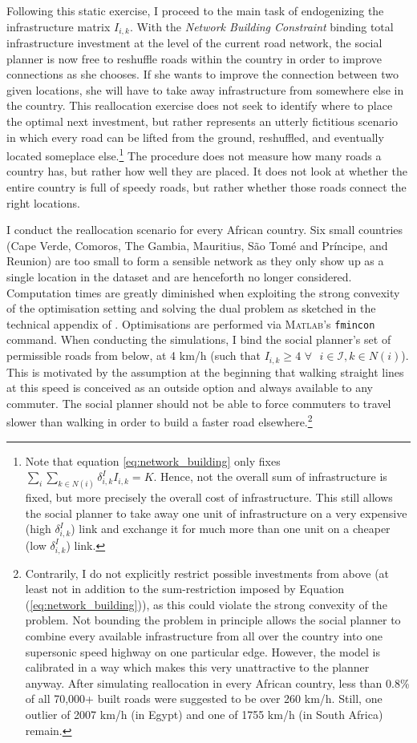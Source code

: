 \documentclass[11pt, oneside]{article}   	%
\let\oldref\ref
\renewcommand{\ref}[1]{(\oldref{#1})}
\begin{document}
Following this static exercise, I proceed to the main task of endogenizing the infrastructure matrix $I_{i,k}$. With the \emph{Network Building Constraint} binding total infrastructure investment at the level of the current road network, the social planner is now free to reshuffle roads within the country in order to improve connections as she chooses. If she wants to improve the connection between two given locations, she will have to take away infrastructure from somewhere else in the country. This reallocation exercise does not seek to identify where to place the optimal next investment, but rather represents an utterly fictitious scenario in which every road can be lifted from the ground, reshuffled, and eventually located someplace else.\footnote{Note that equation \eqref{eq:network_building} only fixes $\sum_{i}^{}\sum_{k \in N(i)}^{} \delta_{i,k}^{I}I_{i,k} = K$. Hence, not the overall sum of infrastructure is fixed, but more precisely the overall cost of infrastructure. This still allows the social planner to take away one unit of infrastructure on a very expensive (high $\delta_{i,k}^{I}$) link and exchange it for much more than one unit on a cheaper (low $\delta_{i,k}^{I}$) link.} The procedure does not measure how many roads a country has, but rather how well they are placed. It does not look at whether the entire country is full of speedy roads, but rather whether those roads connect the right locations.

I conduct the reallocation scenario for every African country. Six small countries (Cape Verde, Comoros, The Gambia, Mauritius, São Tomé and Príncipe, and Reunion) are too small to form a sensible network as they only show up as a single location in the dataset and are henceforth no longer considered. Computation times are greatly diminished when exploiting the strong convexity of the optimisation setting and solving the dual problem as sketched in the technical appendix of \cite{Fajgelbaum_OptimalTransportNetworks_2017}. Optimisations are performed via \textsc{Matlab}'s \texttt{fmincon} command. When conducting the simulations, I bind the social planner's set of permissible roads from below, at 4 km/h (such that $I_{i,k} \geq 4$ $ \forall \textrm{ } i \in \mathcal{I},k \in N(i)$). This is motivated by the assumption at the beginning that walking straight lines at this speed is conceived as an outside option and always available to any commuter. The social planner should not be able to force commuters to travel slower than walking in order to build a faster road elsewhere.\footnote{Contrarily, I do not explicitly restrict possible investments from above (at least not in addition to the sum-restriction imposed by Equation \ref{eq:network_building}), as this could violate the strong convexity of the problem. Not bounding the problem in principle allows the social planner to combine every available infrastructure from all over the country into one supersonic speed highway on one particular edge. However, the model is calibrated in a way which makes this very unattractive to the planner anyway. After simulating reallocation in every African country, less than 0.8\% of all 70,000+ built roads were suggested to be over 260 km/h. Still, one outlier of 2007 km/h (in Egypt) and one of 1755 km/h (in South Africa) remain.}
\end{document}
